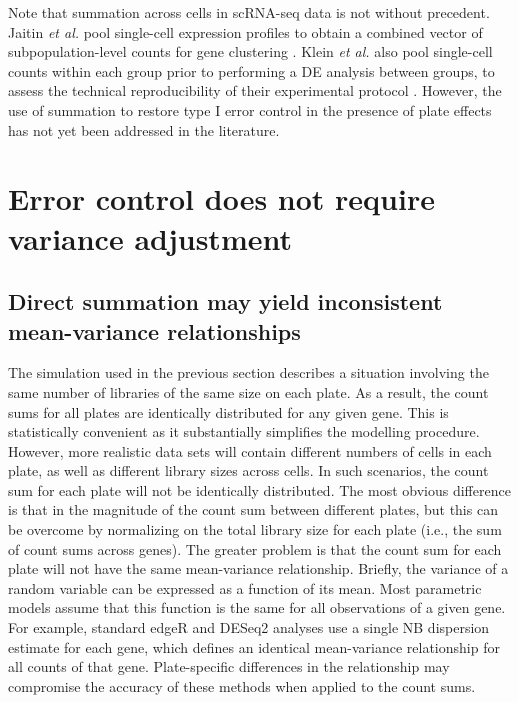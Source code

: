 \documentclass[oupdraft]{bio}
\begin{document}
Note that summation across cells in scRNA-seq data is not without precedent.
Jaitin \textit{et al.} pool single-cell expression profiles to obtain a combined vector of subpopulation-level counts for gene clustering \citep{jaitin2014massively}.
Klein \textit{et al.} also pool single-cell counts within each group prior to performing a DE analysis between groups,
    to assess the technical reproducibility of their experimental protocol \citep{klein2015droplet}.
However, the use of summation to restore type I error control in the presence of plate effects has not yet been addressed in the literature.

\section{Error control does not require variance adjustment}

\subsection{Direct summation may yield inconsistent mean-variance relationships}
The simulation used in the previous section describes a situation involving the same number of libraries of the same size on each plate.
As a result, the count sums for all plates are identically distributed for any given gene.
This is statistically convenient as it substantially simplifies the modelling procedure.
However, more realistic data sets will contain different numbers of cells in each plate, as well as different library sizes across cells.
In such scenarios, the count sum for each plate will not be identically distributed.
The most obvious difference is that in the magnitude of the count sum between different plates, 
    but this can be overcome by normalizing on the total library size for each plate (i.e., the sum of count sums across genes).
The greater problem is that the count sum for each plate will not have the same mean-variance relationship.
Briefly, the variance of a random variable can be expressed as a function of its mean.
Most parametric models assume that this function is the same for all observations of a given gene.
For example, standard edgeR and DESeq2 analyses use a single NB dispersion estimate for each gene, which defines an identical mean-variance relationship for all counts of that gene.
Plate-specific differences in the relationship may compromise the accuracy of these methods when applied to the count sums.
\end{document}
